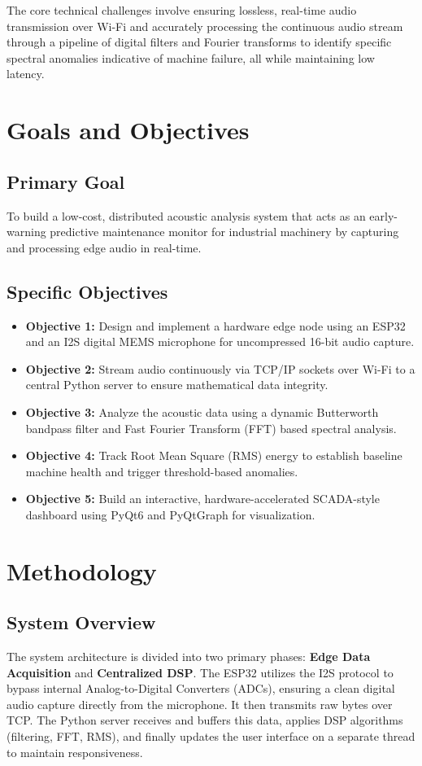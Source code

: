 \documentclass[11pt,a4paper]{article}
\begin{document}
The core technical challenges involve ensuring lossless, real-time audio transmission over Wi-Fi and accurately processing the continuous audio stream through a pipeline of digital filters and Fourier transforms to identify specific spectral anomalies indicative of machine failure, all while maintaining low latency.

\section{Goals and Objectives}
\subsection{Primary Goal}
To build a low-cost, distributed acoustic analysis system that acts as an early-warning predictive maintenance monitor for industrial machinery by capturing and processing edge audio in real-time.

\subsection{Specific Objectives}
\begin{itemize}
    \item \textbf{Objective 1:} Design and implement a hardware edge node using an ESP32 and an I2S digital MEMS microphone for uncompressed 16-bit audio capture.
    \item \textbf{Objective 2:} Stream audio continuously via TCP/IP sockets over Wi-Fi to a central Python server to ensure mathematical data integrity.
    \item \textbf{Objective 3:} Analyze the acoustic data using a dynamic Butterworth bandpass filter and Fast Fourier Transform (FFT) based spectral analysis.
    \item \textbf{Objective 4:} Track Root Mean Square (RMS) energy to establish baseline machine health and trigger threshold-based anomalies.
    \item \textbf{Objective 5:} Build an interactive, hardware-accelerated SCADA-style dashboard using PyQt6 and PyQtGraph for visualization.
\end{itemize}

\section{Methodology}
\subsection{System Overview}
The system architecture is divided into two primary phases: \textbf{Edge Data Acquisition} and \textbf{Centralized DSP}. The ESP32 utilizes the I2S protocol to bypass internal Analog-to-Digital Converters (ADCs), ensuring a clean digital audio capture directly from the microphone. It then transmits raw bytes over TCP. The Python server receives and buffers this data, applies DSP algorithms (filtering, FFT, RMS), and finally updates the user interface on a separate thread to maintain responsiveness.
\end{document}
